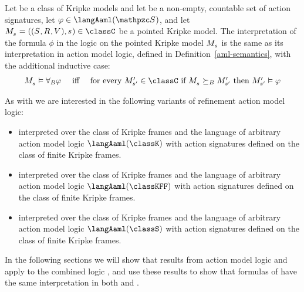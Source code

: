 \begin{definition}
Let \classC{} be a class of Kripke models and let \aSignatureFamily{} be a non-empty, countable set of action signatures, let $\phi \in \langAaml(\aSignatureFamily)$, and let $\kPModelAndTuple{\kStateS} \in \classC$ be a pointed Kripke model.
The interpretation of the formula $\phi$ in the logic \logicRamlC{} on the pointed Kripke model $\kPModel{\kStateS}$ is the same as its interpretation in action model logic, defined in Definition~\ref{aml-semantics}, with the additional inductive case:
$$
\begin{array}{lcl}
    \kPModel{\kStateS} \entails \allactsBs \phi & \text{ iff } & \text{for every } \kPModelP{\kStateSP} \in \classC \text{ if } \kPModel{\kStateS} \simulatesBs \kPModelP{\kStateSP} \text{ then } \kPModelP{\kStateSP} \entails \phi
\end{array}
$$
\end{definition}

As with \logicAaml{} we are interested in the following variants of refinement action model logic:
\begin{itemize}
    \item \logicRamlK{} interpreted over the class of \classK{} Kripke frames and the language of arbitrary action model logic $\langAaml(\classK)$ with action signatures defined on the class of finite \classK{} Kripke frames.
    \item \logicRamlKFF{} interpreted over the class of \classKFF{} Kripke frames and the language of arbitrary action model logic $\langAaml(\classKFF)$ with action signatures defined on the class of finite \classKFF{} Kripke frames.
    \item \logicRamlS{} interpreted over the class of \classS{} Kripke frames and the language of arbitrary action model logic $\langAaml(\classS)$ with action signatures defined on the class of finite \classS{} Kripke frames.
\end{itemize}

In the following sections we will show that results from action model logic and \logicRml{} apply to the combined logic \logicRaml{}, and use these results to show that formulas of \langAaml{} have the same interpretation in both \logicAaml{} and \logicRaml{}.

\pagebreak
